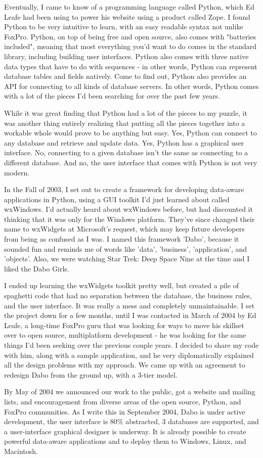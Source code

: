 Eventually, I came to know of a programming language called Python, which Ed Leafe had been using to power his website using a product called Zope. I found Python to be very intuitive to learn, with an easy readable syntax not unlike FoxPro. Python, on top of being free and open source, also comes with "batteries included", meaning that most everything you'd want to do comes in the standard library, including building user interfaces. Python also comes with three native data types that have to do with sequences - in other words, Python can represent database tables and fields natively. Come to find out, Python also provides an API for connecting to all kinds of database servers. In other words, Python comes with a lot of the pieces I'd been searching for over the past few years.

While it was great finding that Python had a lot of the pieces to my puzzle, it was another thing entirely realizing that putting all the pieces together into a workable whole would prove to be anything but easy. Yes, Python can connect to any database and retrieve and update data. Yes, Python has a graphical user interface. No, connecting to a given database isn't the same as connecting to a different database. And no, the user interface that comes with Python is not very modern.

In the Fall of 2003, I set out to create a framework for developing data-aware applications in Python, using a GUI toolkit I'd just learned about called wxWindows. I'd actually heard about wxWindows before, but had discounted it thinking that it was only for the Windows platform. They've since changed their name to wxWidgets at Microsoft's request, which may keep future developers from being as confused as I was. I named this framework 'Dabo', because it sounded fun and reminds me of words like 'data', 'business', 'application', and 'objects'. Also, we were watching Star Trek: Deep Space Nine at the time and I liked the Dabo Girls.

I ended up learning the wxWidgets toolkit pretty well, but created a pile of spaghetti code that had no separation between the database, the business rules, and the user interface. It was really a mess and completely unmaintainable. I set the project down for a few months, until I was contacted in March of 2004 by Ed Leafe, a long-time FoxPro guru that was looking for ways to move his skillset over to open source, multiplatform development - he was looking for the same things I'd been seeking over the previous couple years. I decided to share my code with him, along with a sample application, and he very diplomatically explained all the design problems with my approach. We came up with an agreement to redesign Dabo from the ground up, with a 3-tier model.

By May of 2004 we announced our work to the public, got a website and mailing lists, and encouragement from diverse areas of the open source, Python, and FoxPro communities. As I write this in September 2004, Dabo is under active development, the user interface is 80\% abstracted, 3 databases are supported, and a user-interface graphical designer is underway. It is already possible to create powerful data-aware applications and to deploy them to Windows, Linux, and Macintosh.
